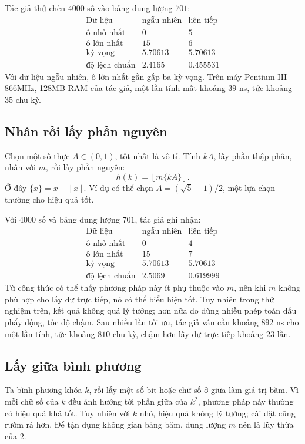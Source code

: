 \documentclass[11pt]{article}
\newcommand{\floor}[1]{\left\lfloor #1 \right\rfloor}
\newcommand{\fracpart}[1]{\{#1\}}
\begin{document}
Tác giả thử chèn $4000$ số vào bảng dung lượng $701$:
\[
\begin{array}{lrr}
\text{Dữ liệu} & \text{ngẫu nhiên} & \text{liên tiếp}\\
\hline
\text{ô nhỏ nhất} & 0 & 5\\
\text{ô lớn nhất} & 15 & 6\\
\text{kỳ vọng} & 5.70613 & 5.70613\\
\text{độ lệch chuẩn} & 2.4165 & 0.455531
\end{array}
\]
Với dữ liệu ngẫu nhiên, ô lớn nhất gần gấp ba kỳ vọng. Trên máy Pentium III
866MHz, 128MB RAM của tác giả, một lần tính mất khoảng $39$ ns, tức khoảng
$35$ chu kỳ.

\subsection{Nhân rồi lấy phần nguyên}

Chọn một số thực $A\in(0,1)$, tốt nhất là vô tỉ. Tính $kA$, lấy phần thập
phân, nhân với $m$, rồi lấy phần nguyên:
\[
  h(k)=\floor{m\fracpart{kA}}.
\]
Ở đây $\fracpart{x}=x-\floor{x}$. Ví dụ có thể chọn $A=(\sqrt5-1)/2$, một lựa
chọn thường cho hiệu quả tốt.

Với $4000$ số và bảng dung lượng $701$, tác giả ghi nhận:
\[
\begin{array}{lrr}
\text{Dữ liệu} & \text{ngẫu nhiên} & \text{liên tiếp}\\
\hline
\text{ô nhỏ nhất} & 0 & 4\\
\text{ô lớn nhất} & 15 & 7\\
\text{kỳ vọng} & 5.70613 & 5.70613\\
\text{độ lệch chuẩn} & 2.5069 & 0.619999
\end{array}
\]
Từ công thức có thể thấy phương pháp này ít phụ thuộc vào $m$, nên khi $m$
không phù hợp cho lấy dư trực tiếp, nó có thể biểu hiện tốt. Tuy nhiên trong
thử nghiệm trên, kết quả không quá lý tưởng; hơn nữa do dùng nhiều phép toán
dấu phẩy động, tốc độ chậm. Sau nhiều lần tối ưu, tác giả vẫn cần khoảng
$892$ ns cho một lần tính, tức khoảng $810$ chu kỳ, chậm hơn lấy dư trực tiếp
khoảng $23$ lần.

\subsection{Lấy giữa bình phương}

Ta bình phương khóa $k$, rồi lấy một số bit hoặc chữ số ở giữa làm giá trị
băm. Vì mỗi chữ số của $k$ đều ảnh hưởng tới phần giữa của $k^2$, phương pháp
này thường có hiệu quả khá tốt. Tuy nhiên với $k$ nhỏ, hiệu quả không lý
tưởng; cài đặt cũng rườm rà hơn. Để tận dụng không gian bảng băm, dung lượng
$m$ nên là lũy thừa của $2$.
\end{document}
